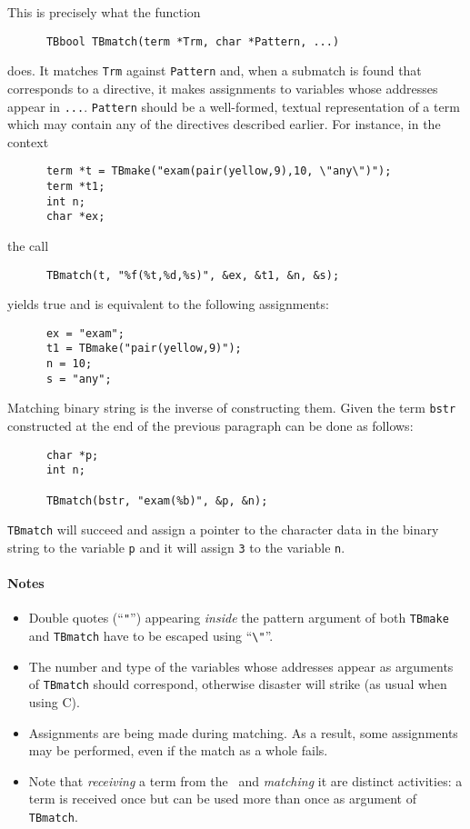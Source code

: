 \noindent This is precisely what the function
\begin{verbatim}
      TBbool TBmatch(term *Trm, char *Pattern, ...)
\end{verbatim}
does. It matches {\tt Trm} against {\tt Pattern} and, when a submatch
is found that corresponds to a directive, it makes assignments to
variables whose addresses appear in {\tt ...}.  {\tt Pattern} should
be a well-formed, textual representation of a term which may contain
any of the directives described earlier.  For instance, in the context
\begin{verbatim}
      term *t = TBmake("exam(pair(yellow,9),10, \"any\")");
      term *t1;
      int n;
      char *ex;
\end{verbatim}
the call 
\begin{verbatim}
      TBmatch(t, "%f(%t,%d,%s)", &ex, &t1, &n, &s);
\end{verbatim}
yields true and is equivalent to the following assignments:
\begin{verbatim}
      ex = "exam";
      t1 = TBmake("pair(yellow,9)");
      n = 10;
      s = "any";
\end{verbatim}

Matching binary string is the inverse of constructing them. Given
the term {\tt bstr} constructed at the end of the previous paragraph
can be done as follows:
\begin{verbatim}
      char *p;
      int n;

      TBmatch(bstr, "exam(%b)", &p, &n);
\end{verbatim}
{\tt TBmatch} will succeed and assign a pointer to the character data
in the binary string to the variable 
{\tt p} and it will assign {\tt 3} to the variable {\tt n}.


\paragraph{Notes}
\begin{itemize}
\item Double quotes (``{\tt "}'') appearing {\em inside} the pattern argument
of both {\tt TBmake} and {\tt TBmatch} have to be escaped using ``\verb-\"-''.
\item The number and type of the variables whose addresses appear
as arguments of {\tt TBmatch} should correspond, otherwise disaster
will strike (as usual when using C).
\item Assignments are being made during matching. As a result, some assignments
may be performed, even if the match as a whole fails.
\item Note that {\em receiving} a term from the \TB\ and {\em matching} it are distinct
activities: a term is received once but can be used more than once
as argument of {\tt TBmatch}.
\end{itemize}

